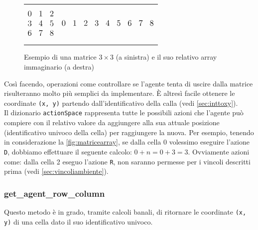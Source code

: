 \begin{figure}[H]
\begin{tabular}{m{20em} m{20em}}
	\begin{equation*}
		\large
		\begin{matrix}
			0 & 1 & 2\\
			3 & 4 & 5\\
			6 & 7 & 8 \\
		\end{matrix}
	\end{equation*}
	&
	\begin{equation*}
		\large
		\begin{matrix}
			0 & 1 & 2 & 3 & 4 & 5 & 6 & 7 & 8 \\
		\end{matrix}
	\end{equation*}
\end{tabular}
\caption{Esempio di una matrice $3 \times 3$ (a sinistra) e il suo relativo array immaginario (a destra)}
\label{fig:matricearray}
\end{figure}

Cos\`{i} facendo, operazioni come controllare se l'agente tenta di uscire dalla matrice risulteranno molto pi\`{u} semplici da implementare. \`{E} altres\`{i} facile ottenere le coordinate \lstinline[style=cmd]|(x, y)| partendo dall'identificativo della calla (vedi \autoref{sec:inttoxy}).\\

Il dizionario \lstinline[style=cmd]|actionSpace| rappresenta tutte le possibili azioni che l'agente pu\`{o} compiere con il relativo valore da aggiungere alla sua attuale posizione (identificativo univoco della cella) per raggiungere la nuova. Per esempio, tenendo in considerazione la \autoref{fig:matricearray}, se dalla cella 0 volessimo eseguire l'azione \lstinline[style=cmd]|D|, dobbiamo effettuare il seguente calcolo: $0 + n = 0 + 3 = 3$. Ovviamente azioni come: dalla cella 2 eseguo l'azione \lstinline[style=cmd]|R|, non saranno permesse per i vincoli descritti prima (vedi \autoref{sec:vincoliambiente}).
\pagebreak
\subsubsection{get\_agent\_row\_column}
\label{sec:inttoxy}

Questo metodo \`{e} in grado, tramite calcoli banali, di ritornare le coordinate \lstinline[style=cmd]|(x, y)| di una cella dato il suo identificativo univoco.\\

